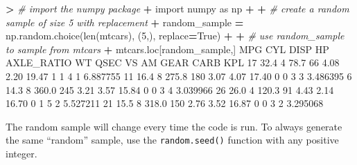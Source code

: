 \documentclass[
]{book}
\newenvironment{Shaded}{\begin{snugshade}}{\end{snugshade}}
\newcommand{\BuiltInTok}[1]{#1}
\newcommand{\CommentTok}[1]{\textcolor[rgb]{0.56,0.35,0.01}{\textit{#1}}}
\newcommand{\DecValTok}[1]{\textcolor[rgb]{0.00,0.00,0.81}{#1}}
\newcommand{\FloatTok}[1]{\textcolor[rgb]{0.00,0.00,0.81}{#1}}
\newcommand{\ImportTok}[1]{#1}
\newcommand{\NormalTok}[1]{#1}
\newcommand{\OperatorTok}[1]{\textcolor[rgb]{0.81,0.36,0.00}{\textbf{#1}}}
\newcommand{\VariableTok}[1]{\textcolor[rgb]{0.00,0.00,0.00}{#1}}
\begin{document}
\begin{Shaded}
\begin{Highlighting}[]
\OperatorTok{\textgreater{}} \CommentTok{\# import the numpy package}
\OperatorTok{+} \ImportTok{import}\NormalTok{ numpy }\ImportTok{as}\NormalTok{ np}
\OperatorTok{+} 
\OperatorTok{+} \CommentTok{\# create a random sample of size 5 with replacement}
\OperatorTok{+}\NormalTok{ random\_sample }\OperatorTok{=}\NormalTok{ np.random.choice(}\BuiltInTok{len}\NormalTok{(mtcars), (}\DecValTok{5}\NormalTok{,), replace}\OperatorTok{=}\VariableTok{True}\NormalTok{)}
\OperatorTok{+} 
\OperatorTok{+} \CommentTok{\# use random\_sample to sample from mtcars}
\OperatorTok{+}\NormalTok{ mtcars.loc[random\_sample,]}
\NormalTok{     MPG  CYL   DISP   HP  AXLE\_RATIO    WT   QSEC  VS AM  GEAR  CARB       KPL}
\DecValTok{17}  \FloatTok{32.4}    \DecValTok{4}   \FloatTok{78.7}   \DecValTok{66}        \FloatTok{4.08}  \FloatTok{2.20}  \FloatTok{19.47}   \DecValTok{1}  \DecValTok{1}     \DecValTok{4}     \DecValTok{1}  \FloatTok{6.887755}
\DecValTok{11}  \FloatTok{16.4}    \DecValTok{8}  \FloatTok{275.8}  \DecValTok{180}        \FloatTok{3.07}  \FloatTok{4.07}  \FloatTok{17.40}   \DecValTok{0}  \DecValTok{0}     \DecValTok{3}     \DecValTok{3}  \FloatTok{3.486395}
\DecValTok{6}   \FloatTok{14.3}    \DecValTok{8}  \FloatTok{360.0}  \DecValTok{245}        \FloatTok{3.21}  \FloatTok{3.57}  \FloatTok{15.84}   \DecValTok{0}  \DecValTok{0}     \DecValTok{3}     \DecValTok{4}  \FloatTok{3.039966}
\DecValTok{26}  \FloatTok{26.0}    \DecValTok{4}  \FloatTok{120.3}   \DecValTok{91}        \FloatTok{4.43}  \FloatTok{2.14}  \FloatTok{16.70}   \DecValTok{0}  \DecValTok{1}     \DecValTok{5}     \DecValTok{2}  \FloatTok{5.527211}
\DecValTok{21}  \FloatTok{15.5}    \DecValTok{8}  \FloatTok{318.0}  \DecValTok{150}        \FloatTok{2.76}  \FloatTok{3.52}  \FloatTok{16.87}   \DecValTok{0}  \DecValTok{0}     \DecValTok{3}     \DecValTok{2}  \FloatTok{3.295068}
\end{Highlighting}
\end{Shaded}

The random sample will change every time the code is run. To always generate the same ``random'' sample, use the \texttt{random.seed()} function with any positive integer.
\end{document}
